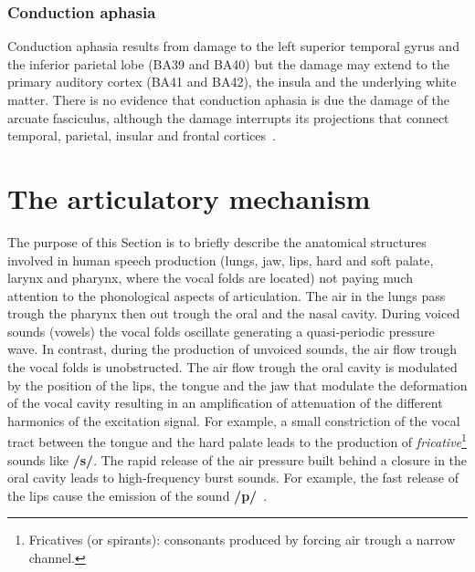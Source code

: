 \subsubsection{Conduction aphasia}
\label{sec:speech:language:aphasias:conduction}
Conduction aphasia results from damage to the left superior temporal gyrus and
the inferior parietal lobe (BA39 and BA40) but the damage may extend to the
primary auditory cortex (BA41 and BA42), the insula and the underlying white
matter. There is no evidence that conduction aphasia is due the damage of the
arcuate fasciculus, although the damage interrupts its projections that connect temporal, parietal, insular and frontal 
cortices~\citep{kandel.schwartz.jessel:2000}.
\section{The articulatory mechanism}
\label{sec:speech:language:mechanism}
The purpose of this Section is to briefly describe the anatomical structures
involved in human speech production (lungs, jaw, lips, hard and soft palate, 
larynx and pharynx, where the vocal folds are located) not paying much
attention to the  phonological aspects of articulation.
The air in the lungs pass trough the pharynx then out trough the oral and the
nasal cavity.
During voiced sounds (vowels) the vocal folds oscillate generating a
quasi-periodic pressure wave. 
In contrast, during the production of unvoiced sounds, the air flow trough the
vocal folds is unobstructed.
The air flow trough the oral cavity is modulated by the position of the lips,
the tongue and the jaw that modulate the deformation of the vocal cavity
resulting in an amplification of attenuation of the different harmonics of the
excitation signal. 
For example, a small constriction of the vocal tract between the tongue and 
the hard palate leads to the production of 
\emph{fricative}\footnote{Fricatives (or spirants):
consonants produced by forcing air trough a narrow channel.} sounds like
\textbf{/s/}.
The rapid release of the air pressure built behind a closure in the oral cavity
leads to high-frequency burst sounds. 
For example, the fast release of the lips cause the emission of the
sound \textbf{/p/}~\citep{blackburn:1996,epstein.etal:2002}.
